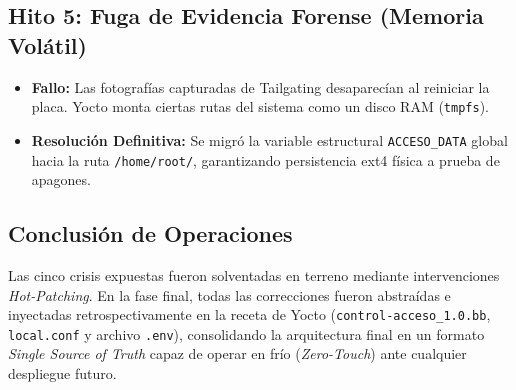 \documentclass[11pt,a4paper]{article}
\begin{document}
\subsection{Hito 5: Fuga de Evidencia Forense (Memoria Volátil)}
\begin{itemize}
\item \textbf{Fallo:} Las fotografías capturadas de Tailgating desaparecían al reiniciar la placa. Yocto monta ciertas rutas del sistema como un disco RAM (\texttt{tmpfs}).
\item \textbf{Resolución Definitiva:} Se migró la variable estructural \texttt{ACCESO\_DATA} global hacia la ruta \texttt{/home/root/}, garantizando persistencia ext4 física a prueba de apagones.
\end{itemize}

\subsection{Conclusión de Operaciones}
Las cinco crisis expuestas fueron solventadas en terreno mediante intervenciones \textit{Hot-Patching}. En la fase final, todas las correcciones fueron abstraídas e inyectadas retrospectivamente en la receta de Yocto (\texttt{control-acceso\_1.0.bb}, \texttt{local.conf} y archivo \texttt{.env}), consolidando la arquitectura final en un formato \textit{Single Source of Truth} capaz de operar en frío (\textit{Zero-Touch}) ante cualquier despliegue futuro.
\end{document}
